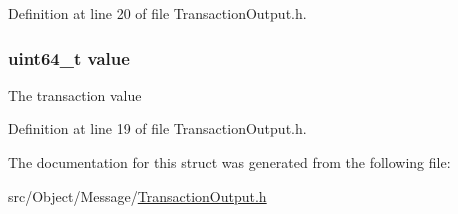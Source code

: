 Definition at line 20 of file TransactionOutput.h.

\hypertarget{struct_transaction_output_a4e630859cc0e2a22bd6acf39a6a8e218}{
\subsubsection[{value}]{\setlength{\rightskip}{0pt plus 5cm}uint64\_\-t {\bf value}}}
\label{struct_transaction_output_a4e630859cc0e2a22bd6acf39a6a8e218}
The transaction value 

Definition at line 19 of file TransactionOutput.h.



The documentation for this struct was generated from the following file:\begin{DoxyCompactItemize}
\item 
src/Object/Message/\hyperlink{_transaction_output_8h}{TransactionOutput.h}\end{DoxyCompactItemize}
